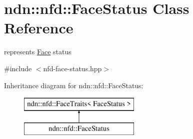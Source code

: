 \hypertarget{classndn_1_1nfd_1_1FaceStatus}{}\section{ndn\+:\+:nfd\+:\+:Face\+Status Class Reference}
\label{classndn_1_1nfd_1_1FaceStatus}


represents \hyperlink{classndn_1_1Face}{Face} status  




{\ttfamily \#include $<$nfd-\/face-\/status.\+hpp$>$}

Inheritance diagram for ndn\+:\+:nfd\+:\+:Face\+Status\+:\begin{figure}[H]
\begin{center}
\leavevmode
\includegraphics[height=2.000000cm]{classndn_1_1nfd_1_1FaceStatus}
\end{center}
\end{figure}
